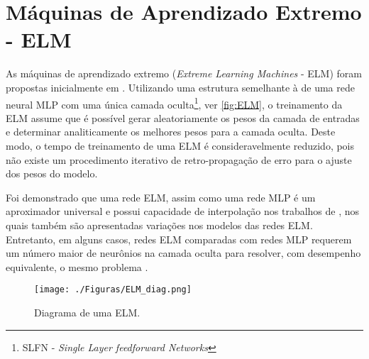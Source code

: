 
\section{Máquinas de Aprendizado Extremo - ELM} \label{sec:ELM}

As máquinas de aprendizado extremo (\emph{Extreme Learning Machines} - ELM) foram propostas inicialmente em . Utilizando uma estrutura semelhante à de uma rede neural MLP com uma única camada oculta\footnote{SLFN - \textit{Single Layer feedforward Networks}}, ver \autoref{fig:ELM}, o treinamento da ELM assume que é possível  gerar aleatoriamente os pesos da camada de entradas e determinar analiticamente os melhores pesos para a camada oculta. Deste modo, o tempo de treinamento de uma ELM é consideravelmente reduzido, pois não existe um procedimento iterativo de retro-propagação de erro para o ajuste dos pesos do modelo.

Foi demonstrado que uma rede ELM, assim como uma rede MLP é um aproximador universal e possui capacidade de interpolação nos trabalhos de , nos quais também são apresentadas variações nos modelos das redes ELM. Entretanto, em alguns casos, redes ELM comparadas com redes MLP requerem um número maior de neurônios na camada oculta para resolver, com desempenho equivalente, o mesmo problema \cite{wang2005}.

\begin{figure}[ht]
	\begin{center}
		\caption{Diagrama de uma ELM.}
		\texttt{[image: ./Figuras/ELM\_diag.png]}
		\label{fig:ELM}
	\end{center}
\end{figure}


